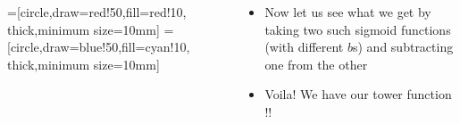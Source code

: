 \documentclass[serif, aspectratio=169]{beamer}
\begin{document}
\begin{frame}
	\begin{columns}
		\begin{overlayarea}{\textwidth}{\textheight}

			=[circle,draw=red!50,fill=red!10, thick,minimum size=10mm]
			=[circle,draw=blue!50,fill=cyan!10, thick,minimum size=10mm]
		\end{overlayarea}


		\begin{overlayarea}{\textwidth}{\textheight}
			\begin{itemize}\justifying
				\item Now let us see what we get by taking two such sigmoid functions (with different $b$s) and subtracting one from the other
				\item<4-> Voila! We have our tower function !!
			\end{itemize}
		\end{overlayarea}
	\end{columns}
\end{frame}
\end{document}
